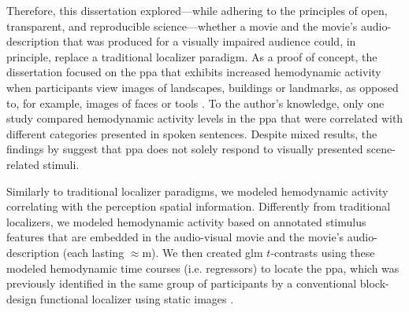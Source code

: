 Therefore, this dissertation explored---while adhering to the principles of
open, transparent, and reproducible science---whether a movie and the movie's
audio-description that was produced for a visually impaired audience could, in
principle, replace a traditional localizer paradigm.
As a proof of concept, the dissertation focused on the \ac{ppa} that exhibits
increased hemodynamic activity when participants view images of landscapes,
buildings or landmarks, as opposed to, for example, images of faces or tools
\citep[s.][for reviews]{epstein2014neural, aminoff2013role}.
To the author's knowledge, only one study \citep[cf.][]{aziz2008modulation}
compared hemodynamic activity levels in the \ac{ppa} that were correlated with
different categories presented in spoken sentences.
%
Despite mixed results, the findings by \citet{aziz2008modulation} suggest that
\ac{ppa} does not solely respond to visually presented scene-related stimuli.
\begin{comment}
%
I will evaluate the movie's and audio-description's potential to replace a
visual localizer in two ways.


\subsection{Approach 1: \ac{glm} $t$-contrasts}

First,

\end{comment}
%
Similarly to traditional localizer paradigms, we modeled hemodynamic activity
correlating with the perception spatial information.
Differently from traditional localizers, we modeled hemodynamic activity based
on annotated stimulus features that are embedded in the audio-visual movie and
the movie's audio-description (each lasting $\approx$\unit[120]{m}).
We then created \ac{glm} $t$-contrasts using these modeled hemodynamic time
courses (i.e. regressors) to locate the \ac{ppa}, which was previously
identified in the same group of participants by a conventional block-design
functional localizer using static images \citep{sengupta2016extension}.
%
